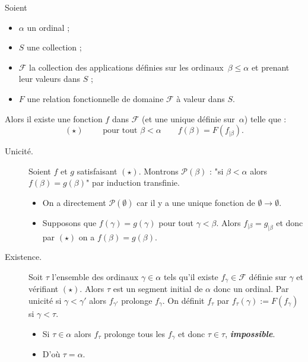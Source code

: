 \documentclass[./main]{subfiles}
\begin{document}
  \begin{lem}
    Soient
    \begin{itemize}
      \item $\alpha$ un ordinal ;
      \item $S$ une collection ;
      \item $\mathcal{F}$ la collection des applications définies sur les ordinaux~$\beta \le \alpha$ et prenant leur valeurs dans $S$ ;
      \item $F$ une relation fonctionnelle de domaine $\mathcal{F}$ à valeur dans $S$.
    \end{itemize}
    Alors il existe une fonction $f$ dans $\mathcal{F}$ (et une unique définie sur~$\alpha$) telle que :
    \[
      (\star) \quad\quad \text{ pour tout } \beta < \alpha \quad\quad f(\beta) = F(f_{|\beta})
    .\] 
  \end{lem}

  \begin{prv}
    \begin{description}
      \item[Unicité.]
        Soient $f$ et $g$ satisfaisant $(\star)$.
        Montrons $\mathcal{P}(\beta)$ : "si $\beta < \alpha$ alors $f(\beta) = g(\beta)$" par induction transfinie.
        \begin{itemize}
          \item On a directement $\mathcal{P}(\emptyset)$ car il y a une unique fonction de $\emptyset \to \emptyset$.
          \item Supposons que $f(\gamma) = g(\gamma)$ pour tout $\gamma < \beta$.
            Alors $f_{|\beta} = g_{|\beta}$ et donc par $(\star)$ on a  $f(\beta) = g(\beta)$.
        \end{itemize}
      \item[Existence.]
        Soit $\tau$ l'ensemble des ordinaux $\gamma \in \alpha$ tels qu'il existe $f_\gamma \in \mathcal{F}$ définie sur $\gamma$ et vérifiant $(\star)$.
        Alors $\tau$ est un segment initial de $\alpha$ donc un ordinal.
        Par unicité si $\gamma < \gamma'$ alors $f_{\gamma'}$ prolonge $f_\gamma$.
        On définit  $f_\tau$ par  $f_\tau(\gamma) := F(f_\gamma)$ si  $\gamma < \tau$.
         \begin{itemize}
          \item Si $\tau \in \alpha$ alors $f_\tau$ prolonge tous les $f_\gamma$ et donc $\tau \in \tau$, \textit{\textbf{impossible}}.
          \item D'où $\tau = \alpha$.
        \end{itemize}
    \end{description}
  \end{prv}
\end{document}
